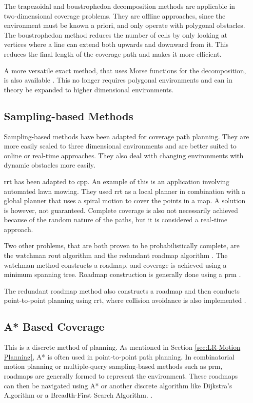 The trapezoidal and boustrophedon decomposition methods are applicable in two-dimensional coverage problems. They are offline approaches, since the environment must be known a priori, and only operate with polygonal obstacles. The boustrophedon method reduces the number of cells by only looking at vertices where a line can extend both upwards and downward from it. This reduces the final length of the coverage path and makes it more efficient. \cite{CPP-Survey-2013} 

A more versatile exact method, that uses Morse functions for the decomposition, is also available \cite{Choset-Morse2000}. This no longer requires polygonal environments and can in theory be expanded to higher dimensional environments.
\subsection{Sampling-based Methods}
Sampling-based methods have been adapted for coverage path planning. They are more easily scaled to three dimensional environments and are better suited to online or real-time approaches. They also deal with changing environments with dynamic obstacles more easily. 

\ac{rrt} has been adapted to \ac{cpp}. An example of this is an application involving automated lawn mowing. They used \ac{rrt} as a local planner in combination with a global planner that uses a spiral motion to cover the points in a map. A solution is however, not guaranteed. Complete coverage is also not necessarily achieved because of the random nature of the paths, but it is considered a real-time approach. \cite{Nourani-Vatani2006}

Two other problems, that are both proven to be probabilistically complete, are the watchman rout algorithm and the redundant roadmap algorithm \cite{Englot2012}. The watchman method constructs a roadmap, and coverage is achieved using a minimum spanning tree. Roadmap construction is generally done using a \ac{prm} \cite{Danner2000}.%

The redundant roadmap method also constructs a roadmap and then conducts point-to-point planning using \ac{rrt}, where collision avoidance is also implemented \cite{Englot2011}.
\subsection{A* Based Coverage}
This is a discrete method of planning. As mentioned in Section \ref{sec:LR-Motion Planning}, A* is often used in point-to-point path planning. In combinatorial motion planning or multiple-query sampling-based methods such as \ac{prm}, roadmaps are generally formed to represent the environment. These roadmaps can then be navigated using A* or another discrete algorithm like Dijkstra's Algorithm or a Breadth-First Search Algorithm. \cite{Lavalle2006}.

